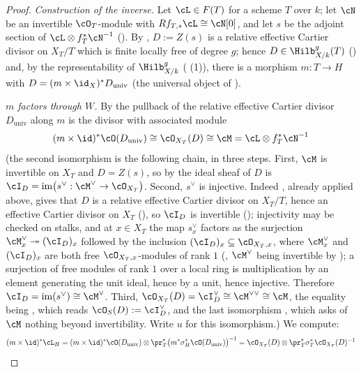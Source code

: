\begin{proof}
\emph{Construction of the inverse.}  Let $\cL\in F(T)$ for a scheme
$T$ over $k$; let $\cN$ be an invertible $\cO_T$-module with
$Rf_{T,*}\cL\cong\cN[0]$, and let $s$ be the adjoint section of
$\cL\otimes f_T^*\cN^{-1}$ ().  By
, $D:=Z(s)$ is a relative effective Cartier
divisor on $X_T/T$ which is finite locally free of degree $g$; hence
$D\in\Hilb^g_{X/k}(T)$ () and, by the
representability of $\Hilb^g_{X/k}$ ( (1)), there
is a morphism $m:T\to H$ with $D=(m\times\id_X)^*D_{\mathrm{univ}}$
(the universal object of ).

\emph{$m$ factors through $W$.}  By
 the pullback of the relative effective
Cartier divisor $D_{\mathrm{univ}}$ along $m$ is the divisor with
associated module
\[
(m\times\id)^*\cO(D_{\mathrm{univ}})\cong\cO_{X_T}(D)\cong\cM
=\cL\otimes f_T^*\cN^{-1}
\]
(the second isomorphism is the following chain, in three steps.  First,
$\cM$ is invertible on $X_T$ and $D=Z(s)$, so by 
the ideal sheaf of $D$ is $\cI_D=\operatorname{im}\bigl(s^\vee:\cM^\vee
\to\cO_{X_T}\bigr)$.  Second, $s^\vee$ is injective.  Indeed
, already applied above, gives that $D$ is a
relative effective Cartier divisor on $X_T/T$, hence an effective Cartier
divisor on $X_T$ (), so $\cI_D$ is
invertible (); injectivity may be
checked on stalks, and at $x\in X_T$ the map $s^\vee_x$ factors as the
surjection $\cM^\vee_x\twoheadrightarrow(\cI_D)_x$ followed by the
inclusion $(\cI_D)_x\subseteq\cO_{X_T,x}$, where $\cM^\vee_x$ and
$(\cI_D)_x$ are both free $\cO_{X_T,x}$-modules of rank $1$
(, $\cM^\vee$ being invertible by
); a surjection of free modules of rank
$1$ over a local ring is multiplication by an element generating the unit
ideal, hence by a unit, hence injective.  Therefore
$\cI_D=\operatorname{im}(s^\vee)\cong\cM^\vee$.  Third,
$\cO_{X_T}(D)=\cI_D^\vee\cong\cM^{\vee\vee}\cong\cM$, the equality
being , which reads
$\cO_S(D):=\cI_D^\vee$, and the last isomorphism
, which asks of $\cM$ nothing beyond
invertibility.  Write $u$ for this isomorphism.)  We compute:
\[
(m\times\id)^*\cL_H
=(m\times\id)^*\cO(D_{\mathrm{univ}})
\otimes\pr_T^*\bigl(m^*\sigma_H^*\cO(D_{\mathrm{univ}})\bigr)^{-1}
=\cO_{X_T}(D)\otimes\pr_T^*\sigma_T^*\cO_{X_T}(D)^{-1}
\]
\end{proof}
